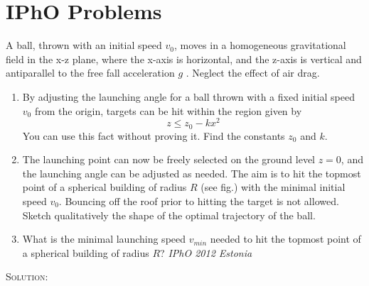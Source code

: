 \section{IPhO Problems}

A ball, thrown with an initial speed $v_0$, moves in a homogeneous gravitational field in the x-z plane, where the x-axis is horizontal, and the z-axis is vertical and antiparallel to the free fall acceleration $g$ . Neglect the effect of air drag.
\begin{enumerate} [label=\roman*)]
\item By adjusting the launching angle for a ball thrown with a fixed initial speed $v_0$ from the origin, targets can be
hit within the region given by
\begin{equation} \label{eq26}
z \leq z_0 - kx^2
\end{equation}
You can use this fact without proving it. Find the constants $z_0$ and $k$.
\item The launching point can now be freely selected on the ground level $z = 0$, and the launching angle can be adjusted as needed. The aim is to hit the topmost point of a spherical building of radius $R$ (see fig.) with the
minimal initial speed $v_0$. Bouncing off the roof prior to hitting the target is not allowed. Sketch qualitatively the shape of the optimal trajectory of the ball. 
\item What is the minimal launching speed $v_{min}$ needed
to hit the topmost point of a spherical building of radius $R$? \hfill \textsl{IPhO 2012 Estonia}

\end{enumerate}

\textsc{Solution:}

